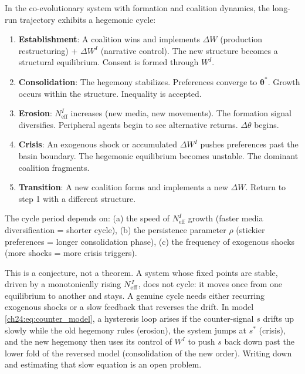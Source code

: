\documentclass[../structural_economics_book.tex]{subfiles}
\begin{document}
\begin{conjecture}\label{ch24:thm:cycle}
In the co-evolutionary system with formation and coalition dynamics, the long-run trajectory exhibits a hegemonic cycle:
\begin{enumerate}
\item \textbf{Establishment}: A coalition wins and implements $\Delta W$ (production restructuring) + $\Delta W^I$ (narrative control). The new structure becomes a structural equilibrium. Consent is formed through $W^I$.
\item \textbf{Consolidation}: The hegemony stabilizes. Preferences converge to $\boldsymbol{\theta}^*$. Growth occurs within the structure. Inequality is accepted.
\item \textbf{Erosion}: $N_{\text{eff}}^I$ increases (new media, new movements). The formation signal diversifies. Peripheral agents begin to see alternative returns. $\Delta\theta$ begins.
\item \textbf{Crisis}: An exogenous shock or accumulated $\Delta W^I$ pushes preferences past the basin boundary. The hegemonic equilibrium becomes unstable. The dominant coalition fragments.
\item \textbf{Transition}: A new coalition forms and implements a new $\Delta W$. Return to step 1 with a different structure.
\end{enumerate}

The cycle period depends on: (a) the speed of $N_{\text{eff}}^I$ growth (faster media diversification = shorter cycle), (b) the persistence parameter $\rho$ (stickier preferences = longer consolidation phase), (c) the frequency of exogenous shocks (more shocks = more crisis triggers).
\end{conjecture}

\begin{remark}\label{ch24:rem:cycle_mechanism}
This is a conjecture, not a theorem. A system whose fixed points are stable, driven by a monotonically rising $N_{\text{eff}}^I$, does not cycle: it moves once from one equilibrium to another and stays. A genuine cycle needs either recurring exogenous shocks or a slow feedback that reverses the drift. In model \eqref{ch24:eq:counter_model}, a hysteresis loop arises if the counter-signal $s$ drifts up slowly while the old hegemony rules (erosion), the system jumps at $s^*$ (crisis), and the new hegemony then uses its control of $W^I$ to push $s$ back down past the lower fold of the reversed model (consolidation of the new order). Writing down and estimating that slow equation is an open problem.
\end{remark}
\end{document}

